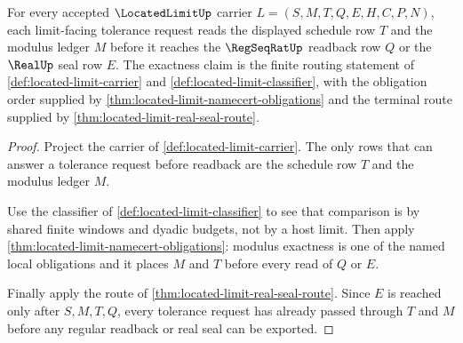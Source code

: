 \begin{theorem}
\label{thm:located-limit-window-schedule-exactness}
For every accepted $\LocatedLimitUp$ carrier $L=(S,M,T,Q,E,H,C,P,N)$, each limit-facing tolerance request reads the displayed schedule row $T$ and the modulus ledger $M$ before it reaches the $\RegSeqRatUp$ readback row $Q$ or the $\RealUp$ seal row $E$. The exactness claim is the finite routing statement of \autoref{def:located-limit-carrier} and \autoref{def:located-limit-classifier}, with the obligation order supplied by \autoref{thm:located-limit-namecert-obligations} and the terminal route supplied by \autoref{thm:located-limit-real-seal-route}.
\end{theorem}
\begin{proof}
Project the carrier of \autoref{def:located-limit-carrier}. The only rows that can answer a tolerance request before readback are the schedule row $T$ and the modulus ledger $M$.

Use the classifier of \autoref{def:located-limit-classifier} to see that comparison is by shared finite windows and dyadic budgets, not by a host limit. Then apply \autoref{thm:located-limit-namecert-obligations}: modulus exactness is one of the named local obligations and it places $M$ and $T$ before every read of $Q$ or $E$.

Finally apply the route of \autoref{thm:located-limit-real-seal-route}. Since $E$ is reached only after $S,M,T,Q$, every tolerance request has already passed through $T$ and $M$ before any regular readback or real seal can be exported.
\end{proof}

